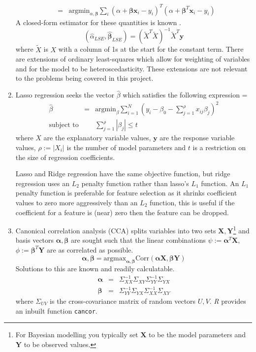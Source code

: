 \documentclass[bibliography=totoc,11pt,a4paper,margin=0]{article}
\theoremstyle{break}
\begin{document}
\begin{enumerate}
\[\begin{array}{rcl}
      &=&\text{argmin}_{\alpha,\pmb\beta}\sum_i \left(\alpha+\pmb\beta\mathbf{x}_i-y_i\right)^T\left(\alpha+\pmb\beta^T\mathbf{x}_i-y_i\right)
    \end{array}\]
    A closed-form estimator for these quantities is known \cite[]{econometrics}.
    \[ (\hat\alpha_{LSE},\hat{\pmb\beta}_{LSE})=\left(\tilde{X}^T\tilde{X}\right)^{-1}\tilde{X}^T \mathbf{y} \]
    where $\tilde{X}$ is $X$ with a column of 1s at the start for the constant term. There are extensions of ordinary least-squares which allow for weighting of variables and for the model to be heteroscedasticity. These extensions are not relevant to the problems being covered in this project.

    \item Lasso regression \cite[]{elements_of_statistical_learning} seeks the vector $\hat\beta$ which satisfies the following expression
    \everymath={\displaystyle}
    \[\begin{array}{rcl}
      \hat\beta&=&\text{argmin}_\beta\sum_{i=1}^N\left(y_i-\beta_0-\sum_{j=1}^\rho x_{ij}\beta_j\right)^2\\
      \text{subject to}&&\sum_{j=1}^\rho|\beta_j|\leq t
    \end{array}\]
    where $X$ are the explanatory variable values, $\mathbf{y}$ are the response variable values, $\rho:=|X_i|$ is the number of model parameters and $t$ is a restriction on the size of regression coefficients.
    \par Lasso and Ridge regression have the same objective function, but ridge regression uses an $L_2$ penalty function rather than lasso's $L_1$ function. An $L_1$ penalty function is preferable for feature selection as it shrinks coefficient values to zero more aggressively than an $L_2$ function, this is useful if the coefficient for a feature is (near) zero then the feature can be dropped.

    \item Canonical correlation analysis (CCA) \cite[]{multivariate_analysis} splits variables into two sets $\mathbf{X},\mathbf{Y}$\footnote{For Bayesian modelling you typically set $\mathbf{X}$ to be the model parameters and $ \textbf{Y}$ to be observed values.} and basis vectors $\pmb\alpha,\pmb\beta$ are sought such that the linear combinations ${\psi:=\pmb\alpha^T\mathbf{X}}$, ${\phi:=\pmb\beta^T\mathbf{Y}}$ are as correlated as possible. %
    \[ \pmb\alpha,\pmb\beta=\text{argmax}_{\pmb\alpha,\pmb\beta}\text{Corr}(\pmb\alpha\mathbf{X},\pmb\beta\mathbf{Y}) \]
    Solutions to this are known and readily calculatable.
    \[\begin{array}{rcl}
      \pmb\alpha&=&\Sigma_{XX}^{-1}\Sigma_{XY}\Sigma_{YY}^{-1}\Sigma_{YX}\\
      \pmb\beta&=&\Sigma_{YY}^{-1}\Sigma_{YX}\Sigma_{XX}^{-1}\Sigma_{XY}
    \end{array}\]
    where $\Sigma_{UV}$ is the cross-covariance matrix of random vectors $U,V$. \textit{R} provides an inbuilt function \texttt{cancor}.
  \end{enumerate}
\end{document}
